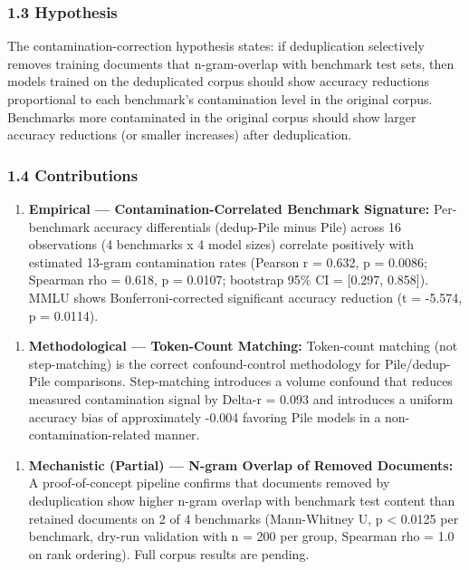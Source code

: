 \subsubsection{1.3 Hypothesis}

The contamination-correction hypothesis states: if deduplication selectively removes training documents that n-gram-overlap with benchmark test sets, then models trained on the deduplicated corpus should show accuracy reductions proportional to each benchmark's contamination level in the original corpus. Benchmarks more contaminated in the original corpus should show larger accuracy reductions (or smaller increases) after deduplication.

\subsubsection{1.4 Contributions}

\begin{enumerate}
\item \textbf{Empirical --- Contamination-Correlated Benchmark Signature:} Per-benchmark accuracy differentials (dedup-Pile minus Pile) across 16 observations (4 benchmarks x 4 model sizes) correlate positively with estimated 13-gram contamination rates (Pearson r = 0.632, p = 0.0086; Spearman rho = 0.618, p = 0.0107; bootstrap 95\% CI = [0.297, 0.858]). MMLU shows Bonferroni-corrected significant accuracy reduction (t = -5.574, p = 0.0114).
\end{enumerate}

\begin{enumerate}
\item \textbf{Methodological --- Token-Count Matching:} Token-count matching (not step-matching) is the correct confound-control methodology for Pile/dedup-Pile comparisons. Step-matching introduces a volume confound that reduces measured contamination signal by Delta-r = 0.093 and introduces a uniform accuracy bias of approximately -0.004 favoring Pile models in a non-contamination-related manner.
\end{enumerate}

\begin{enumerate}
\item \textbf{Mechanistic (Partial) --- N-gram Overlap of Removed Documents:} A proof-of-concept pipeline confirms that documents removed by deduplication show higher n-gram overlap with benchmark test content than retained documents on 2 of 4 benchmarks (Mann-Whitney U, p < 0.0125 per benchmark, dry-run validation with n = 200 per group, Spearman rho = 1.0 on rank ordering). Full corpus results are pending.
\end{enumerate}

